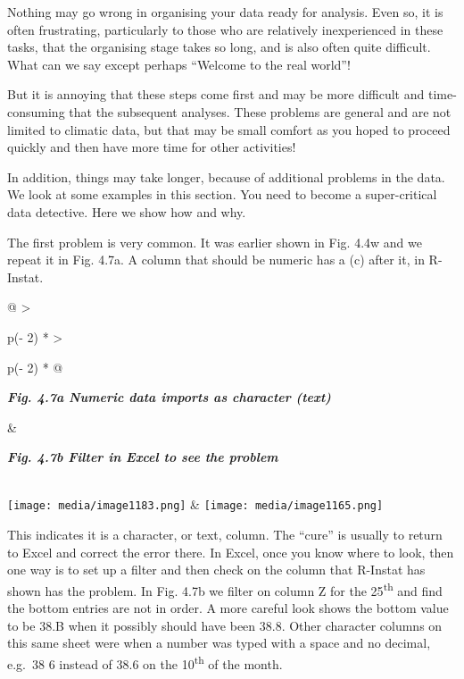 \documentclass[
  letterpaper,
  DIV=11,
  numbers=noendperiod]{scrreprt}
\begin{document}
Nothing may go wrong in organising your data ready for analysis. Even
so, it is often frustrating, particularly to those who are relatively
inexperienced in these tasks, that the organising stage takes so long,
and is also often quite difficult. What can we say except perhaps
``Welcome to the real world''!

But it is annoying that these steps come first and may be more difficult
and time-consuming that the subsequent analyses. These problems are
general and are not limited to climatic data, but that may be small
comfort as you hoped to proceed quickly and then have more time for
other activities!

In addition, things may take longer, because of additional problems in
the data. We look at some examples in this section. You need to become a
super-critical data detective. Here we show how and why.

The first problem is very common. It was earlier shown in Fig. 4.4w and
we repeat it in Fig. 4.7a. A column that should be numeric has a (c)
after it, in R-Instat.

\begin{longtable}[]{@{}
  >{\raggedright\arraybackslash}p{(\columnwidth - 2\tabcolsep) * }
  >{\raggedright\arraybackslash}p{(\columnwidth - 2\tabcolsep) * }@{}}
\toprule\noalign{}
\begin{minipage}[b]{\linewidth}\raggedright
\textbf{\emph{Fig. 4.7a Numeric data imports as character (text)}}
\end{minipage} & \begin{minipage}[b]{\linewidth}\raggedright
\textbf{\emph{Fig. 4.7b Filter in Excel to see the problem}}
\end{minipage} \\
\midrule\noalign{}
\endhead
\bottomrule\noalign{}
\endlastfoot
\texttt{[image: media/image1183.png]}
&
\texttt{[image: media/image1165.png]} \\
\end{longtable}

This indicates it is a character, or text, column. The ``cure'' is
usually to return to Excel and correct the error there. In Excel, once
you know where to look, then one way is to set up a filter and then
check on the column that R-Instat has shown has the problem. In Fig.
4.7b we filter on column Z for the 25\textsuperscript{th} and find the
bottom entries are not in order. A more careful look shows the bottom
value to be 38.B when it possibly should have been 38.8. Other character
columns on this same sheet were when a number was typed with a space and
no decimal, e.g.~38 6 instead of 38.6 on the 10\textsuperscript{th} of
the month.
\end{document}
